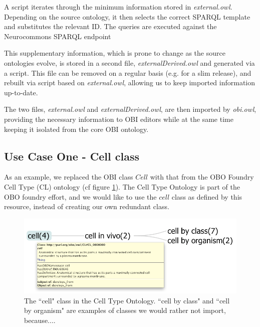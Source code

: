 \documentclass{elsart3p}    %
\begin{document}
A script iterates through the minimum information stored in \emph{external.owl}.
Depending on the source ontology, it then selects the correct SPARQL template and substitutes the relevant ID.
The queries are executed against the Neurocommons SPARQL endpoint\cite{RefWorks:1540}

This supplementary information, which is prone to change as the source ontologies evolve, is stored in a second file, \emph{externalDerived.owl} and generated via a script. 
This file can be removed on a regular basis (e.g. for a slim release), and rebuilt via script based on \emph{external.owl}, allowing us to keep imported information up-to-date.

The two files, \emph{external.owl} and \emph{externalDerived.owl}, are then imported by \emph{obi.owl}, providing the necessary information to OBI editors while at the same time keeping it isolated from the core OBI ontology.


\subsection*{Use Case One - Cell class}

As an example, we replaced the OBI class $Cell$ with that from the OBO Foundry Cell Type (CL) ontology (cf figure \ref{fig:cell}).
The Cell Type Ontology \cite{RefWorks:1559} is part of the OBO foundry effort, and we would like to use the $cell$ class as defined by this resource, instead of creating our own redundant class.

\begin{figure}[t]
\centering \includegraphics*[width=1\columnwidth]{./figs/cell}
\caption{The ``cell" class in the Cell Type Ontology. ``cell by class" and ``cell by organism" are examples of classes we would rather not import, because....}
\label{fig:cell}
\end{figure}
\end{document}
